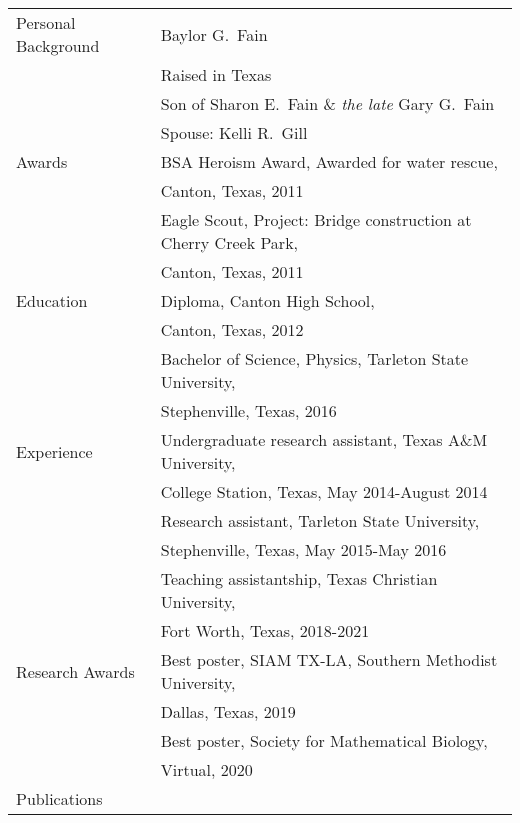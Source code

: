 \begin{tabular}{ll}
Personal Background 	 & Baylor G.\ Fain \\
						 & Raised in Texas\\
						 & Son of Sharon E.\ Fain \& \emph{the late} Gary G.\ Fain \\
    					 & Spouse: Kelli R.\ Gill \\[5mm]
Awards                   & BSA Heroism Award, Awarded for water rescue, \\   & \hspace{10mm} Canton, Texas, 2011 \\
                         & Eagle Scout, Project: Bridge construction at Cherry Creek Park,\\   & \hspace{10mm} Canton, Texas, 2011 \\
Education				 & Diploma, Canton High School, \\  & \hspace{10mm} Canton, Texas, 2012 \\
						 & Bachelor of Science, Physics, Tarleton State University, \\  & \hspace{10mm} Stephenville, Texas, 2016 \\
Experience			    & Undergraduate research assistant, Texas A\&M University, \\	 & \hspace{10mm} College Station, Texas, May 2014-August 2014 \\
                        & Research assistant, Tarleton State University, \\	 & \hspace{10mm} Stephenville, Texas, May 2015-May 2016 \\
						 & Teaching assistantship, Texas Christian University, \\ 	 & \hspace{10mm} Fort Worth, Texas, 2018-2021 \\
Research Awards         & Best poster, SIAM TX-LA, Southern Methodist University,\\   & \hspace{10mm} Dallas, Texas, 2019 \\
                        & Best poster, Society for Mathematical Biology,\\   & \hspace{10mm} Virtual, 2020 \\
Publications 
\end{tabular}
